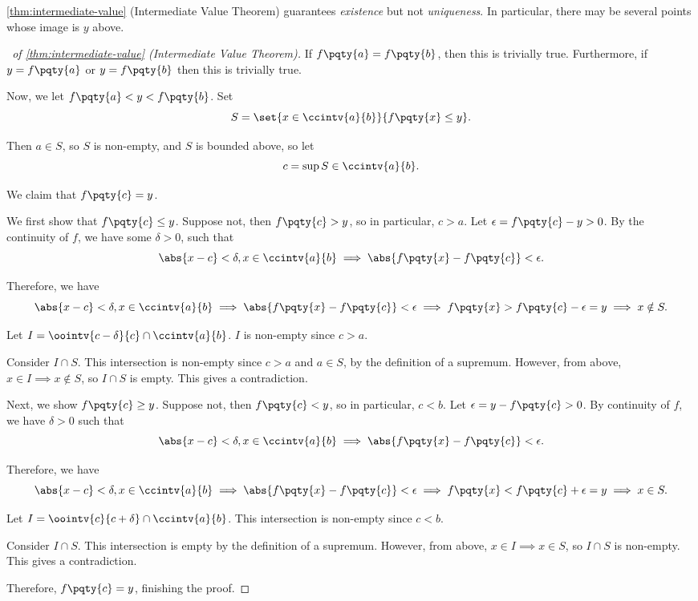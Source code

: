 \begin{remark}
    \autoref{thm:intermediate-value} (Intermediate Value Theorem) guarantees \emph{existence} but not \emph{uniqueness}. In particular, there may be several points whose image is \(y\) above.
\end{remark}

\begin{proof}[\proofname\ of \autoref{thm:intermediate-value} (Intermediate Value Theorem)]
    If \(f \pqty{a} = f\pqty{b}\), then this is trivially true. Furthermore, if \(y = f\pqty{a}\) or \(y = f\pqty{b}\) then this is trivially true.

    Now, we let \(f\pqty{a} < y < f\pqty{b}\). Set
    \[
        S = \set{x \in \ccintv{a}{b}}{f\pqty{x} \leq y}.
    \]

    Then \(a \in S\), so \(S\) is non-empty, and \(S\) is bounded above, so let
    \[
        c = \sup S \in \ccintv{a}{b}.
    \]

    We claim that \(f\pqty{c} = y\).

    We first show that \(f\pqty{c} \leq y\). Suppose not, then \(f\pqty{c} > y\), so in particular, \(c > a\). Let \(\epsilon = f\pqty{c} - y > 0\). By the continuity of \(f\), we have some \(\delta > 0\), such that
    \[
        \abs{x - c} < \delta, x \in \ccintv{a}{b} \implies \abs{f\pqty{x} - f\pqty{c}} < \epsilon.
    \]

    Therefore, we have
    \[
         \abs{x - c} < \delta, x \in \ccintv{a}{b} \implies \abs{f\pqty{x} - f\pqty{c}} < \epsilon \implies f\pqty{x} > f\pqty{c} - \epsilon = y \implies x \notin S.
    \]

    Let \(I = \oointv{c - \delta}{c} \cap \ccintv{a}{b}\). \(I\) is non-empty since \(c > a\).

    Consider \(I \cap S\). This intersection is non-empty since \(c > a\) and \(a \in S\), by the definition of a supremum. However, from above, \(x \in I \implies x \notin S\), so \(I \cap S\) is empty. This gives a contradiction.

    Next, we show \(f\pqty{c} \geq y\). Suppose not, then \(f\pqty{c} < y\), so in particular, \(c < b\). Let \(\epsilon = y - f\pqty{c} > 0\). By continuity of \(f\), we have \(\delta > 0\) such that
    \[
        \abs{x - c} < \delta, x \in \ccintv{a}{b} \implies \abs{f\pqty{x} - f\pqty{c}} < \epsilon.
    \]

    Therefore, we have
    \[
        \abs{x - c} < \delta, x \in \ccintv{a}{b} \implies \abs{f\pqty{x} - f\pqty{c}} < \epsilon \implies f\pqty{x} < f\pqty{c} + \epsilon = y \implies x \in S.
    \]
    
    Let \(I = \oointv{c}{c + \delta} \cap \ccintv{a}{b}\). This intersection is non-empty since \(c < b\).
    
    Consider \(I \cap S\). This intersection is empty by the definition of a supremum. However, from above, \(x \in I \implies x \in S\), so \(I \cap S\) is non-empty. This gives a contradiction.

    Therefore, \(f\pqty{c} = y\), finishing the proof.
\end{proof}

